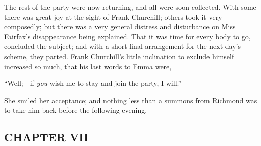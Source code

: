 







The rest of the party were now returning, and all were soon collected. With some there was great joy at the sight of Frank Churchill; others took it very composedly; but there was a very general distress and disturbance on Miss Fairfax's disappearance being explained. That it was time for every body to go, concluded the subject; and with a short final arrangement for the next day's scheme, they parted. Frank Churchill's little inclination to exclude himself increased so much, that his last words to Emma were,

“Well;---if {\em you} wish me to stay and join the party, I will.”

She smiled her acceptance; and nothing less than a summons from Richmond was to take him back before the following evening.

\subsection[chapter-vii-2]{\useURL[url45][][][]\from[url45]CHAPTER VII}

